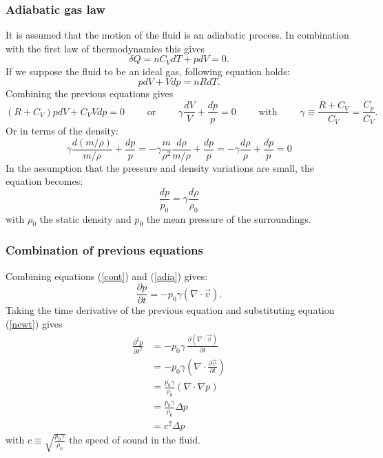 \subsubsection*{Adiabatic gas law}
\vspace{-15pt}
It is assumed that the motion of the fluid is an adiabatic process. In combination with the first law of thermodynamics this gives
\[
\delta Q = n C_V dT + p dV = 0.
\]
If we suppose the fluid to be an ideal gas, following equation holds:
\[
p dV + V dp = n R dT.
\]
Combining the previous equations gives
\[
(R+ C_V ) p dV + C_V V dp = 0  \qquad \textrm{ or } \qquad \gamma \frac{dV}{V} + \frac{dp}{p} = 0 \qquad \textrm{ with } \qquad \gamma \equiv \frac{R+C_V}{C_V} = \frac{C_p}{C_V}.
\]
Or in terms of the density:
\[
\gamma \frac{d(m/\rho)}{m/ \rho} + \frac{dp}{p} = -\gamma \frac{m}{\rho^2} \frac{d\rho}{m/ \rho} + \frac{dp}{p} =- \gamma \frac{d\rho}{\rho} + \frac{dp}{p} =0
\]
In the assumption that the pressure and density variations are small, the equation becomes:
\begin{equation}
\frac{dp}{p_0} =\gamma \frac{d\rho}{\rho_0}
\label{adia}
\end{equation}
with $\rho_0$ the static density and $p_0$ the mean pressure of the surroundings.





\subsubsection*{Combination of previous equations}
\vspace{-15pt}
Combining equations (\ref{cont}) and (\ref{adia}) gives:
\[
\frac{\partial p}{\partial t} = - p_0 \gamma \left(\nabla \cdot \vec{v}\right).
\]
Taking the time derivative of the previous equation and substituting equation (\ref{newt}) gives
\begin{align*}
\frac{\partial^2 p}{\partial t^2} &= - p_0 \gamma \,\frac{\partial \left(\nabla \cdot \vec{v}\right)}{\partial t}\\
&= - p_0 \gamma \left(\nabla \cdot \frac{\partial \vec{v} }{\partial t}\right)\\
&= \frac{p_0 \gamma}{\rho_0} \left(\nabla \cdot \nabla p\right)\\
&=  \frac{p_0 \gamma}{\rho_0}  \Delta p\\
&= c^2 \Delta p
\end{align*}
with $c\equiv \sqrt{\frac{p_0 \gamma}{\rho_0}}$ the speed of sound in the fluid.







